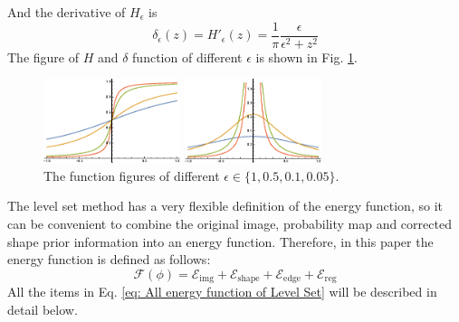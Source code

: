 And the derivative of $H_\epsilon$ is
\begin{equation*}
  \delta_\epsilon(z) = H'_\epsilon(z) = \frac{1}{\pi}\frac{\epsilon}{\epsilon^2 + z^2}
\end{equation*}
The figure of $H$ and $\delta$ function of different $\epsilon$ is shown in Fig. \ref{fig: The function figures of different epsilon}.
\begin{figure}[h]
    \centering
    \begin{minipage}[b]{4cm}
        \centering
        \includegraphics[width=4cm]{figs/H.eps}
        \caption*{$H_\epsilon(z)$}
    \end{minipage}
    \mbox{\hspace{0.2cm}}
    \begin{minipage}[b]{4cm}
        \centering
        \includegraphics[width=4cm]{figs/delta.eps}
        \caption*{$\delta_\epsilon(z)$}
    \end{minipage}
    \caption{The function figures of different $\epsilon \in \{1, 0.5, 0.1, 0.05\}$.}
    \label{fig: The function figures of different epsilon}
\end{figure}

The level set method has a very flexible definition of the energy function, so it can be convenient to combine the original image, probability map and corrected shape prior information into an energy function. Therefore, in this paper the energy function is defined as follows:
\begin{equation}\label{eq: All energy function of Level Set}
    \mathcal{F}(\phi) = \mathcal{E}_{\text{img}} + \mathcal{E}_{\text{shape}} + \mathcal{E}_{\text{edge}} + \mathcal{E}_{\text{reg}}
\end{equation}
All the items in Eq. \ref{eq: All energy function of Level Set} will be described in detail below.

